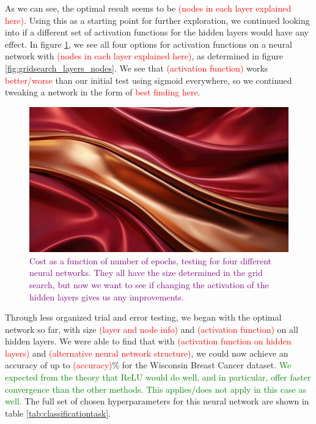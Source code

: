 As we can see, the optimal result seems to be \textcolor{red}{(nodes in each layer explained here)}. Using this as a starting point for further exploration, we continued looking into if a different set of activation functions for the hidden layers would have any effect. In figure \ref{fig:activationfunctions_cost}, we see all four options for activation functions on a neural network with \textcolor{red}{(nodes in each layer explained here)}, as determined in figure \ref{fig:gridsearch_layers_nodes}. We see that \textcolor{red}{(activation function)} works \textcolor{red}{better/worse} than our initial test using sigmoid everywhere, so we continued tweaking a network in the form of \textcolor{red}{best finding here}.

\begin{figure}
    \centering
    \includegraphics[width=0.5\linewidth]{figures/placeholders/activationfunctions_cost.png}
    \caption{\textcolor{purple}{Cost as a function of number of epochs, testing for four different neural networks. They all have the size determined in the grid search, but now we want to see if changing the activation of the hidden layers gives us any improvements.}}
    \label{fig:activationfunctions_cost}
\end{figure}

Through less organized trial and error testing, we began with the optimal network so far, with size \textcolor{red}{(layer and node info)} and \textcolor{red}{(activation function)} on all hidden layers. We were able to find that with \textcolor{red}{(activation function on hidden layers)} and \textcolor{red}{(alternative neural network structure)}, we could now achieve an accuracy of up to \textcolor{red}{(accuracy)}\% for the Wisconsin Breast Cancer dataset. \textcolor{green}{We expected from the theory that ReLU would do well, and in particular, offer faster convergence than the other methods. This applies/does not apply in this case as well.} The full set of chosen hyperparameters for this neural network are shown in table \ref{tab:classificationtask}.

